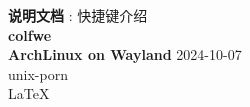 \documentclass[11pt]{article}
\date{\today}
\title{}
\begin{document}
\begin{titlepage}
  \begin{center}
    \vspace*{1cm} \textbf{说明文档} : 快捷键介绍 \vspace{0.5cm}
    \vspace{0.5cm}  \\ \textbf{colfwe} \\ \vspace{5.5cm} \textbf{ArchLinux on Wayland} \vfill 2024-10-07 \vspace{0.8cm} \\
    unix-porn \\ \LaTeX \\ \vspace{0.6cm}
  \end{center}
\end{titlepage}

\tableofcontents

\newpage{}
\end{document}
